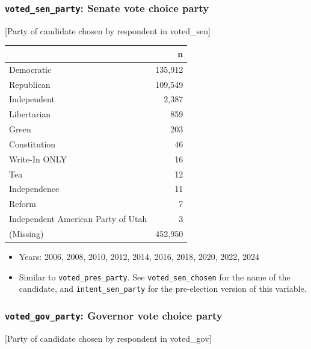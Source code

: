 \documentclass[10pt,article,oneside]{memoir}
\begin{document}
\subsubsection{\texorpdfstring{\texttt{voted\_sen\_party}: Senate vote
choice
party}{voted\_sen\_party: Senate vote choice party}}\label{voted_sen_party-senate-vote-choice-party}

{[}Party of candidate chosen by respondent in voted\_sen{]}

\begin{table}[H]
\centering
\begin{tabular}[t]{lr}
\toprule
 & n\\
\midrule
Democratic & 135,912\\
Republican & 109,549\\
Independent & 2,387\\
Libertarian & 859\\
Green & 203\\
Constitution & 46\\
Write-In ONLY & 16\\
Tea & 12\\
Independence & 11\\
Reform & 7\\
Independent American Party of Utah & 3\\
(Missing) & 452,950\\
\bottomrule
\end{tabular}
\end{table}

\begin{itemize}
\tightlist
\item
  Years: 2006, 2008, 2010, 2012, 2014, 2016, 2018, 2020, 2022, 2024
\item
  Similar to \texttt{voted\_pres\_party}. See
  \texttt{voted\_sen\_chosen} for the name of the candidate, and
  \texttt{intent\_sen\_party} for the pre-election version of this
  variable.
\end{itemize}

\subsubsection{\texorpdfstring{\texttt{voted\_gov\_party}: Governor vote
choice
party}{voted\_gov\_party: Governor vote choice party}}\label{voted_gov_party-governor-vote-choice-party}

{[}Party of candidate chosen by respondent in voted\_gov{]}
\end{document}
